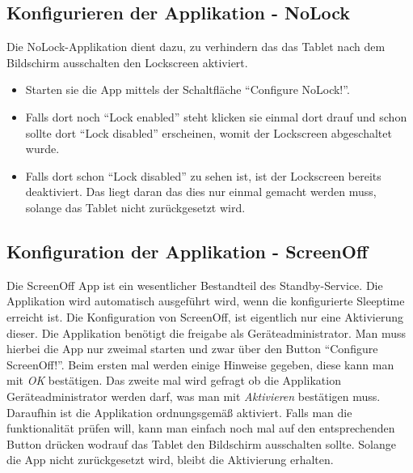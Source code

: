 \begin{flushleft}
  \subsection{Konfigurieren der Applikation - NoLock}
    Die NoLock-Applikation dient dazu, zu verhindern das das Tablet nach dem Bildschirm ausschalten den Lockscreen aktiviert.
    \begin{itemize}
      \item Starten sie die App mittels der Schaltfläche ``Configure NoLock!''.
      \item Falls dort noch ``Lock enabled'' steht klicken sie einmal dort drauf und schon sollte dort ``Lock disabled'' erscheinen, womit der Lockscreen abgeschaltet wurde.
      \item Falls dort schon ``Lock disabled'' zu sehen ist, ist der Lockscreen bereits deaktiviert. Das liegt daran das dies nur einmal gemacht werden muss, solange das Tablet nicht zurückgesetzt wird.
    \end{itemize}
  \subsection{Konfiguration der Applikation - ScreenOff}
    Die ScreenOff App ist ein wesentlicher Bestandteil des Standby-Service. Die Applikation wird automatisch ausgeführt wird, wenn die konfigurierte Sleeptime erreicht ist.
    Die Konfiguration von ScreenOff, ist eigentlich nur eine Aktivierung dieser. Die Applikation benötigt die freigabe als Geräteadministrator. Man muss hierbei die App nur zweimal starten und zwar über den Button ``Configure ScreenOff!''. Beim ersten mal werden einige Hinweise gegeben, diese kann man mit \textit{OK} bestätigen. Das zweite mal wird gefragt ob die Applikation Geräteadministrator werden darf, was man mit \textit{Aktivieren} bestätigen muss.
    Daraufhin ist die Applikation ordnungsgemäß aktiviert. Falls man die funktionalität prüfen will, kann  man einfach noch mal auf den entsprechenden Button drücken wodrauf das Tablet den Bildschirm ausschalten sollte. Solange die App nicht zurückgesetzt wird, bleibt die Aktivierung erhalten.

\end{flushleft}
